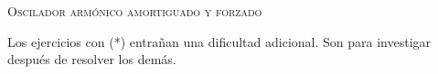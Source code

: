\documentclass[11pt, spanish, a4paper, twopage]{article}
\begin{document}
\begin{center}
	\textsc{\LARGE Oscilador armónico amortiguado y forzado}\\
\end{center}

Los ejercicios con (*) entrañan una dificultad adicional. Son para investigar después de resolver los demás.


\begin{enumerate}







\end{enumerate}
\end{document}
